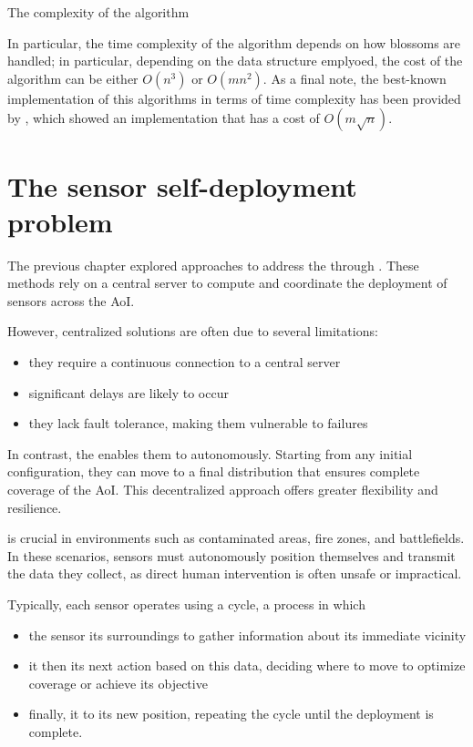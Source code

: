 \documentclass[a4paper, 12pt]{report}
\begin{document}
    The complexity of the algorithm 

    In particular, the time complexity of the algorithm depends on how blossoms are handled; in particular, depending on the data structure emplyoed, the cost of the algorithm can be either $O(n^3)$ or $O(m n^2)$. As a final note, the best-known implementation of this algorithms in terms of time complexity has been provided by \textcite{micali}, which showed an implementation that has a cost of $O(m \sqrt n)$.

    \chapter{The sensor self-deployment problem}

    The previous chapter explored approaches to address the  through . These methods rely on a central server to compute and coordinate the deployment of sensors across the AoI.

    However, centralized solutions are often  due to several limitations:  

    \begin{itemize}
        \item they require a continuous connection to a central server
        \item significant delays are likely to occur
        \item they lack fault tolerance, making them vulnerable to failures
    \end{itemize}

    In contrast, the  enables them to  autonomously. Starting from any initial configuration, they can move to a final distribution that ensures complete coverage of the AoI. This decentralized approach offers greater flexibility and resilience.

     is crucial in  environments such as contaminated areas, fire zones, and battlefields. In these scenarios, sensors must autonomously position themselves and transmit the data they collect, as direct human intervention is often unsafe or impractical.  

    Typically, each sensor operates using a  cycle, a process in which

    \begin{itemize}
        \item the sensor  its surroundings to gather information about its immediate vicinity
        \item it then  its next action based on this data, deciding where to move to optimize coverage or achieve its objective
        \item finally, it  to its new position, repeating the cycle until the deployment is complete.  
    \end{itemize}
\end{document}
